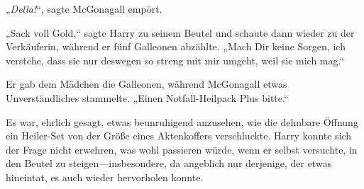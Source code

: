 „\emph{Della!}“, sagte McGonagall empört.

„Sack voll Gold,“ sagte Harry zu seinem Beutel und schaute dann wieder zu der Verkäuferin, während er fünf Galleonen abzählte. „Mach Dir keine Sorgen, ich verstehe, dass sie nur deswegen so streng mit mir umgeht, weil sie mich mag.“

Er gab dem Mädchen die Galleonen, während McGonagall etwas Unverständliches stammelte.
„Einen Notfall-Heilpack Plus bitte.“

Es war, ehrlich gesagt, etwas beunruhigend anzusehen, wie die dehnbare Öffnung ein Heiler-Set von der Größe eines Aktenkoffers verschluckte. Harry konnte sich der Frage nicht erwehren, was wohl passieren würde, wenn er selbst versuchte, in den Beutel zu steigen—insbesondere, da angeblich nur derjenige, der etwas hineintat, es auch wieder hervorholen konnte.

